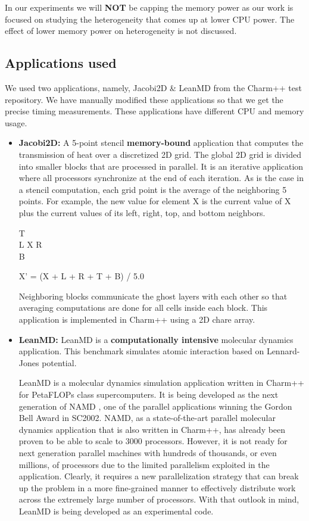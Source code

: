 In our experiments we will \textbf{NOT} be capping the
memory power as our work is focused on studying the heterogeneity that comes up at
lower CPU power. The effect of lower memory power on heterogeneity is not
discussed.



\subsection{Applications used}
We used two applications, namely, Jacobi2D \& LeanMD\cite{leanmd} from the
Charm++ test repository.  We have manually modified these applications so that
we get the precise timing measurements.  These applications have different CPU
and memory usage.

\begin{itemize}
\item \textbf{Jacobi2D: } A 5-point stencil \textbf{memory-bound} application
that computes the transmission of heat over a discretized 2D grid. The global
2D grid is divided into smaller blocks that are processed in parallel. It is an
iterative application where all processors synchronize at the end of each
iteration. As is the case in a stencil computation, each grid point is the
average of the neighboring 5 points.  For example, the new value for element X
is the current value of X plus the current values of its left, right, top, and
bottom neighbors.  

\begin{center}       
T    \\ L X R  \\ B    \\ 
\end{center}
X'  = (X + L + R + T + B) / 5.0

Neighboring blocks communicate the ghost layers with each other so that
averaging computations are done for all cells inside each block. This
application is implemented in Charm++ using a 2D chare array.

\item \textbf{LeanMD: } LeanMD \cite{leanmd} is a \textbf{computationally
  intensive} molecular dynamics application.  This benchmark simulates atomic
  interaction based on Lennard-Jones potential.

LeanMD is a molecular dynamics simulation application written in Charm++ for
PetaFLOPs class supercomputers. It is being developed as the next generation of
NAMD \cite{namd}, one of the parallel
applications winning the Gordon Bell Award in SC2002. NAMD, as a
state-of-the-art parallel molecular dynamics application that is also written
in Charm++, has already been proven to be able to scale to 3000 processors.
However, it is not ready for next generation parallel machines with hundreds of
thousands, or even millions, of processors due to the limited parallelism
exploited in the application.  Clearly, it requires a new parallelization
strategy that can break up the problem in a more fine-grained manner to
effectively distribute work across the extremely large number of processors.
With that outlook in mind, LeanMD is being developed as an experimental code.


\end{itemize}

